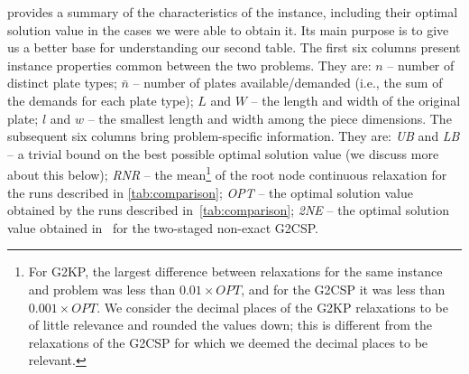 \documentclass[9pt]{entcs}
\begin{document}
 provides a summary of the characteristics of the instance, including their optimal solution value in the cases we were able to obtain it.
Its main purpose is to give us a better base for understanding our second table.
The first six columns present instance properties common between the two problems.
They are:
\(n\) -- number of distinct plate types;
\(\bar{n}\) -- number of plates available/demanded (i.e., the sum of the demands for each plate type);
\(L\) and \(W\) -- the length and width of the original plate;
\underline{\(l\)} and \underline{\(w\)} -- the smallest length and width among the piece dimensions.
The subsequent six columns bring problem-specific information.
They are:
\emph{UB} and \emph{LB} -- a trivial bound on the best possible optimal solution value (we discuss more about this below);
\emph{RNR} -- the mean\footnote{
	For G2KP, the largest difference between relaxations for the same instance and problem was less than \(0.01 \times OPT\), and for the G2CSP it was less than \(0.001 \times OPT\).
	We consider the decimal places of the G2KP relaxations to be of little relevance and rounded the values down; this is different from the relaxations of the G2CSP for which we deemed the decimal places to be relevant.
} of the root node continuous relaxation for the runs described in \cref{tab:comparison};
\emph{OPT} -- the optimal solution value obtained by the runs described in~\cref{tab:comparison};
\emph{2NE} -- the optimal solution value obtained in~\cite{silva:2010} for the two-staged non-exact G2CSP. 
\end{document}
